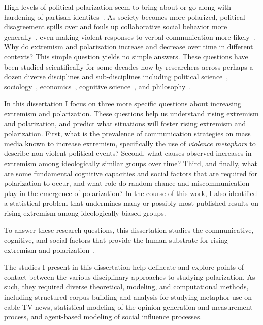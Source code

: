 
High levels of political polarization seem to bring about or go along with
hardening of partisan identites~\cite{Lee2015}.
As society becomes more polarized, political disagreement spills over
and fouls up collaborative social behavior
more generally~\cite{Iyengar2019}, even making violent responses to verbal 
communication more likely~\cite{Kalmoe2014,Kalmoe2018,Mason2018UncivilAgreementBook}.
Why do extremism and polarization increase and decrease over time in different contexts? 
This simple question yields no simple answers. These questions
have been studied scientifically for some decades now by researchers across perhaps a dozen
diverse disciplines and sub-disciplines including 
political science~\cite{Mason2018UncivilAgreementBook,Boxell2020}, 
sociology~\cite{Baldassarri2007,Flache2011}, 
economics~\cite{Schelling1971,Dixit2007}, cognitive science~\cite{Rollwage2019}, 
and philosophy~\cite{OConnor2018}.

In this dissertation I focus
on three more specific questions about increasing extremism and polarization.
These questions help us understand rising extremism and polarization, and
predict what situations will foster rising extremism and polarization.
First, what is the prevalence of communication strategies on mass media
known to increase extremism, specifically the use of \emph{violence metaphors}
to describe non-violent political events? Second, what causes observed
increases in extremism among ideologically similar groups over time?
Third, and finally, what are some fundamental cognitive capacities and
social factors that are required for polarization to occur, and what
role do random chance and miscommunication play in the emergence of
polarization? In the course of this work, I also identified a statistical
problem that undermines many or possibly most published results on rising
extremism among ideologically biased groups.

To answer these research questions, this dissertation studies the communicative, cognitive,
and social factors that provide the human substrate for rising extremism
and polarization~\cite{Jung2019,Rollwage2019}. 

The studies I present in this dissertation help delineate and explore points of contact between
the various disciplinary approaches to studying polarization. As such, they
required diverse theoretical, modeling, and computational methods, 
including structured corpus building and analysis for studying metaphor
use on cable TV news, statistical modeling of the opinion generation and
measurement process, and agent-based modeling of social influence processes.


